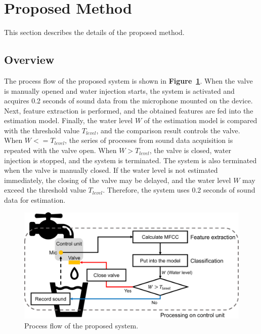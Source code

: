 \documentclass[sigconf]{acmart}
\newcommand\figref[1]{\textbf{Figure~\ref{fig:#1}}}
\begin{document}
\section{Proposed Method}
\label{sec:method}
This section describes the details of the proposed method.

\subsection{Overview}
The process flow of the proposed system is shown in \figref{method}. When the valve is manually opened and water injection starts, the system is activated and acquires 0.2 seconds of sound data from the microphone mounted on the device. Next, feature extraction is performed, and the obtained features are fed into the estimation model. Finally, the water level $W$ of the estimation model is compared with the threshold value $T_{level}$, and the comparison result controls the valve. When $W<=T_{level}$, the series of processes from sound data acquisition is repeated with the valve open. When $W>T_{level}$, the valve is closed, water injection is stopped, and the system is terminated. The system is also terminated when the valve is manually closed. If the water level is not estimated immediately, the closing of the valve may be delayed, and the water level $W$ may exceed the threshold value $T_{level}$. Therefore, the system uses 0.2 seconds of sound data for estimation.

\begin{figure}[!t]
  \centering
  \includegraphics[width=0.9\linewidth]{figures/method.eps}
  \caption{Process flow of the proposed system.}
  \label{fig:method}
\end{figure}


\end{document}
